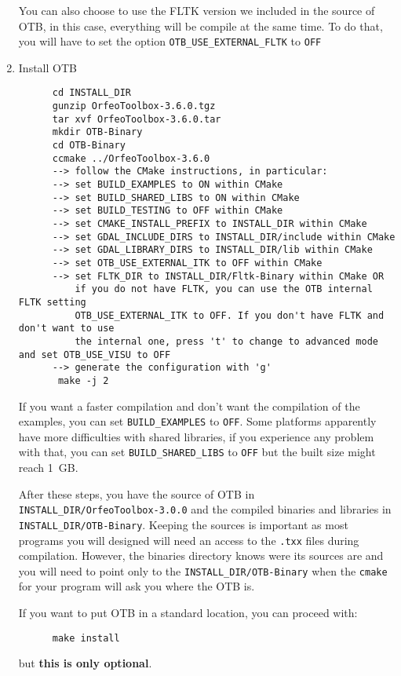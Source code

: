 \begin{enumerate}
   You can also choose to use the FLTK version we included in the source of OTB, in this case, everything will be compile at the same time. To do that, you will have to set the option \texttt{OTB\_USE\_EXTERNAL\_FLTK} to \texttt{OFF}

\item Install OTB
  \begin{verbatim}
      cd INSTALL_DIR
      gunzip OrfeoToolbox-3.6.0.tgz
      tar xvf OrfeoToolbox-3.6.0.tar
      mkdir OTB-Binary
      cd OTB-Binary
      ccmake ../OrfeoToolbox-3.6.0
      --> follow the CMake instructions, in particular:
	  --> set BUILD_EXAMPLES to ON within CMake
	  --> set BUILD_SHARED_LIBS to ON within CMake
	  --> set BUILD_TESTING to OFF within CMake
	  --> set CMAKE_INSTALL_PREFIX to INSTALL_DIR within CMake
	  --> set GDAL_INCLUDE_DIRS to INSTALL_DIR/include within CMake
	  --> set GDAL_LIBRARY_DIRS to INSTALL_DIR/lib within CMake
	  --> set OTB_USE_EXTERNAL_ITK to OFF within CMake
	  --> set FLTK_DIR to INSTALL_DIR/Fltk-Binary within CMake OR
	      if you do not have FLTK, you can use the OTB internal FLTK setting  
	      OTB_USE_EXTERNAL_ITK to OFF. If you don't have FLTK and don't want to use 
	      the internal one, press 't' to change to advanced mode and set OTB_USE_VISU to OFF
	  --> generate the configuration with 'g'
       make -j 2
  \end{verbatim}

  If you want a faster compilation and don't want the compilation of the examples, you
  can set \texttt{BUILD\_EXAMPLES} to \texttt{OFF}. Some platforms apparently
  have more difficulties with shared libraries, if you experience any problem
  with that, you can set \texttt{BUILD\_SHARED\_LIBS} to \texttt{OFF} but the
  built size might reach 1~GB.

  After these steps, you have the source of OTB in \texttt{INSTALL\_DIR/OrfeoToolbox-3.0.0}
  and the compiled binaries and libraries in \texttt{INSTALL\_DIR/OTB-Binary}. Keeping
  the sources is important as most programs you will designed will need an access
  to the \texttt{.txx} files during compilation. However, the binaries directory knows were
  its sources are and you will need to point only to the \texttt{INSTALL\_DIR/OTB-Binary}
  when the \texttt{cmake} for your program will ask you where the OTB is.

  If you want to put OTB in a standard location, you can proceed with:

  \begin{verbatim}
      make install
  \end{verbatim}

  but \textbf{this is only optional}.


\end{enumerate}


